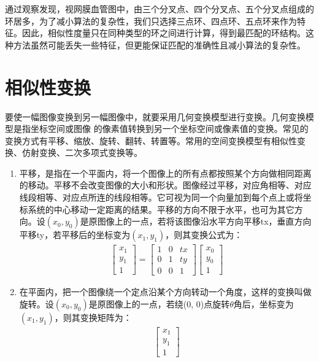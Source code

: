 通过观察发现，视网膜血管图中，由三个分叉点、四个分叉点、五个分叉点组成的环居多，为了减小算法的复杂性，我们只选择三点环、四点环、五点环来作为特征。因此，相似性度量只在同种类型的环之间进行计算，得到最匹配的环结构。这种方法虽然可能丢失一些特征，但更能保证匹配的准确性且减小算法的复杂性。

\section{相似性变换}
\label{}

要使一幅图像变换到另一幅图像中，就要采用几何变换模型进行变换。几何变换模型是指坐标空间或图像 的像素值转换到另一个坐标空间或像素值的变换。常见的变换方式有平移、缩放、旋转、翻转、转置等。常用的空间变换模型有相似性变换、仿射变换、二次多项式变换等。

\begin{enumerate}
\item 平移，是指在一个平面内，将一个图像上的所有点都按照某个方向做相同距离的移动。平移不会改变图像的大小和形状。图像经过平移，对应角相等、对应线段相等、对应点所连的线段相等。它可视为同一个向量加到每个点上或将坐标系统的中心移动一定距离的结果。平移的方向不限于水平，也可为其它方向。设$(x_0,y_0)$是原图像上的一点，若将该图像沿水平方向平移tx，垂直方向平移ty，若平移后的坐标变为$(x_1,y_1)$，则其变换公式为：
\begin{align}
\left[ \begin{array}{c}
x_1 \\
y_1 \\
1   
\end{array} \right]
=
\left[ \begin{array}{ccc}
1 & 0 & tx \\
0 & 1 & ty \\
0 & 0 & 1
\end{array} \right]
\left[ \begin{array}{c}
x_0 \\
y_0 \\
1
\end{array} \right]
\end{align}
\item 在平面内，把一个图像绕一个定点沿某个方向转动一个角度，这样的变换叫做旋转。设$(x_0,y_0)$是原图像上的一点，若绕(0, 0)点旋转$\theta$角后，坐标变为$(x_1,y_1)$，则其变换矩阵为：
\begin{align}
\left[ \begin{array}{c}
x_1 \\
y_1 \\
1   
\end{array} \right]

\end{align}
\end{enumerate}
